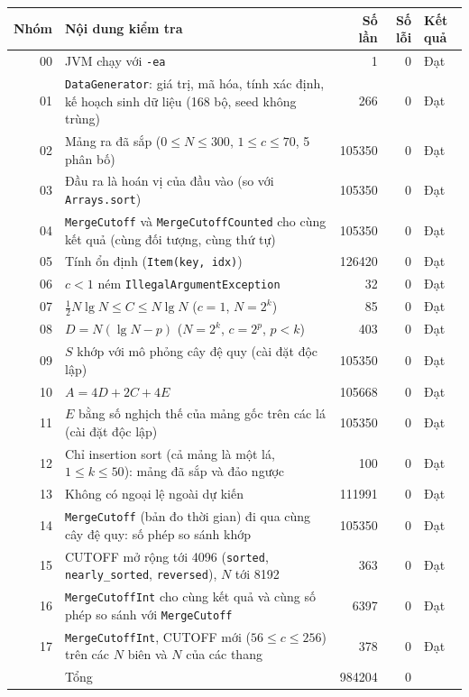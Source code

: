 \begin{tabularx}{\linewidth}{rXrrl}
\toprule
Nhóm & Nội dung kiểm tra & Số lần & Số lỗi & Kết quả \\
\midrule
00 & JVM chạy với \texttt{-ea} & \num{1} & \num{0} & Đạt \\
01 & \texttt{DataGenerator}: giá trị, mã hóa, tính xác định, kế hoạch sinh dữ liệu (168 bộ, seed không trùng) & \num{266} & \num{0} & Đạt \\
02 & Mảng ra đã sắp ($0 \le N \le 300$, $1 \le c \le 70$, 5 phân bố) & \num{105350} & \num{0} & Đạt \\
03 & Đầu ra là hoán vị của đầu vào (so với \texttt{Arrays.sort}) & \num{105350} & \num{0} & Đạt \\
04 & \texttt{MergeCutoff} và \texttt{MergeCutoffCounted} cho cùng kết quả (cùng đối tượng, cùng thứ tự) & \num{105350} & \num{0} & Đạt \\
05 & Tính ổn định (\texttt{Item(key, idx)}) & \num{126420} & \num{0} & Đạt \\
06 & $c < 1$ ném \texttt{IllegalArgumentException} & \num{32} & \num{0} & Đạt \\
07 & $\frac{1}{2} N \lg N \le C \le N \lg N$ ($c = 1$, $N = 2^k$) & \num{85} & \num{0} & Đạt \\
08 & $D = N(\lg N - p)$ ($N = 2^k$, $c = 2^p$, $p < k$) & \num{403} & \num{0} & Đạt \\
09 & $S$ khớp với mô phỏng cây đệ quy (cài đặt độc lập) & \num{105350} & \num{0} & Đạt \\
10 & $A = 4D + 2C + 4E$ & \num{105668} & \num{0} & Đạt \\
11 & $E$ bằng số nghịch thế của mảng gốc trên các lá (cài đặt độc lập) & \num{105350} & \num{0} & Đạt \\
12 & Chỉ insertion sort (cả mảng là một lá, $1 \le k \le 50$): mảng đã sắp và đảo ngược & \num{100} & \num{0} & Đạt \\
13 & Không có ngoại lệ ngoài dự kiến & \num{111991} & \num{0} & Đạt \\
14 & \texttt{MergeCutoff} (bản đo thời gian) đi qua cùng cây đệ quy: số phép so sánh khớp & \num{105350} & \num{0} & Đạt \\
15 & CUTOFF mở rộng tới 4096 (\texttt{sorted}, \texttt{nearly\_sorted}, \texttt{reversed}), $N$ tới 8192 & \num{363} & \num{0} & Đạt \\
16 & \texttt{MergeCutoffInt} cho cùng kết quả và cùng số phép so sánh với \texttt{MergeCutoff} & \num{6397} & \num{0} & Đạt \\
17 & \texttt{MergeCutoffInt}, CUTOFF mới ($56 \le c \le 256$) trên các $N$ biên và $N$ của các thang & \num{378} & \num{0} & Đạt \\
\midrule
 & Tổng & \num{984204} & \num{0} &  \\
\bottomrule
\end{tabularx}
